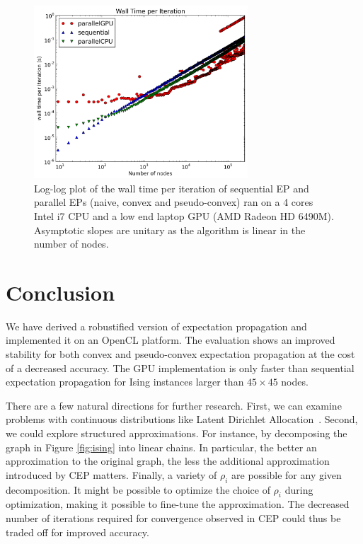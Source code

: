 \documentclass[times, 10pt,twocolumn]{article}
\begin{document}
\begin{figure}[h!]\centering
	\includegraphics[width=8cm]{plots/sizes/time_per_iteration.png}
	\caption{Log-log plot of the wall time per iteration of sequential EP and parallel EPs (naive, convex and pseudo-convex) ran on a 4 cores Intel i7 CPU and a low end laptop GPU (AMD Radeon HD 6490M). Asymptotic slopes are unitary as the algorithm is linear in the number of nodes.}
	\label{speed}
\end{figure}


\section{Conclusion}
We have derived a robustified version of expectation propagation and implemented it on an OpenCL platform. The evaluation shows an improved stability for both convex and pseudo-convex expectation propagation at the cost of a decreased accuracy. The GPU implementation is only faster than sequential expectation propagation for Ising instances larger than $45 \times 45$ nodes.

There are a few natural directions for further research. First, we
can examine problems with continuous distributions like Latent
Dirichlet
Allocation~\cite{lda}. Second,
we could explore structured
approximations. For instance,
by decomposing the graph in
Figure \ref{fig:ising} into
linear chains. In particular,
the better an approximation to
the original graph, the less
the additional approximation
introduced by CEP matters.
Finally, a variety of $\rho_i$
are possible for any given
decomposition. It might be
possible to optimize the choice
of $\rho_i$ during
optimization, making it
possible to fine-tune the
approximation. The decreased
number of iterations required
for convergence observed in CEP
could thus be traded off for
improved accuracy.


 
\end{document}
